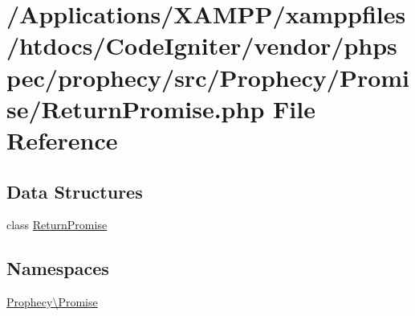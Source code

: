 \hypertarget{_return_promise_8php}{}\section{/\+Applications/\+X\+A\+M\+P\+P/xamppfiles/htdocs/\+Code\+Igniter/vendor/phpspec/prophecy/src/\+Prophecy/\+Promise/\+Return\+Promise.php File Reference}
\label{_return_promise_8php}
\subsection*{Data Structures}
\begin{DoxyCompactItemize}
\item 
class \mbox{\hyperlink{class_prophecy_1_1_promise_1_1_return_promise}{Return\+Promise}}
\end{DoxyCompactItemize}
\subsection*{Namespaces}
\begin{DoxyCompactItemize}
\item 
 \mbox{\hyperlink{namespace_prophecy_1_1_promise}{Prophecy\textbackslash{}\+Promise}}
\end{DoxyCompactItemize}

